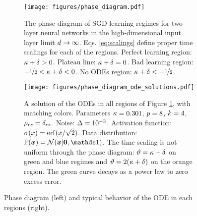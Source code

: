 \documentclass[10pt]{article}
\begin{document}
 
 
 \begin{figure}[t]
\begin{subfigure}{.45\textwidth}
  \centering
    \texttt{[image: figures/phase\_diagram.pdf]}
   \caption{The phase diagram of SGD learning regimes for two-layer neural networks in the high-dimensional input layer limit $d \rightarrow\infty$. Eqs. \eqref{eq:scalings} define proper time scalings for each of the regions. Perfect learning region: $\kappa + \delta > 0 $. Plateau line: $\kappa+\delta=0$. Bad learning region: $-\nicefrac{1}{2} < \kappa + \delta < 0$. No ODEs region: $ \kappa+\delta < - \nicefrac{1}{2}  $.}     \label{fig:phase_diagram}
\end{subfigure}%
\hfill
\begin{subfigure}{.45\textwidth}
  \centering
\centerline{\texttt{[image: figures/phase\_diagram\_ode\_solutions.pdf]}}
\caption{A solution of the ODEs in all regions of Figure \ref{fig:phase_diagram}, with matching colors. Parameters $\kappa = 0.301$, $p=8$, $k=4$, $\rho_{rs} = \delta_{rs}$. Noise: $\Delta = 10^{-3}$. Activation function: $\act(x) = \erf(x/\sqrt{2})$. Data distribution: $\Prob (\x) =  \gauss(\x | \bm{0}, \Id )$.  The time scaling is not uniform through the phase diagram: $\vartheta = \kappa+\delta$ on green and blue regimes and $\vartheta = 2(\kappa+\delta)$ on the orange region. The green curve decays as a power law  to zero excess error.}\label{fig:simul_phdiagr__}
  \end{subfigure}
\caption{Phase diagram (left) and typical behavior of the ODE in each regions (right).}
\end{figure}
 
\end{document}
